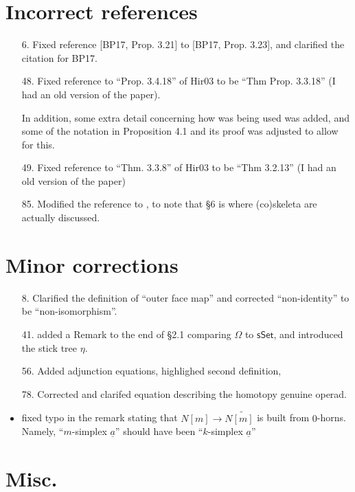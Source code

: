 \documentclass{article}
\begin{document}
\section{Incorrect references}

\begin{itemize}
\item[6.] Fixed reference [BP17, Prop. 3.21] to [BP17, Prop. 3.23], and clarified the citation for BP17.
\item[48.] Fixed reference to ``Prop. 3.4.18'' of Hir03 to be ``Thm Prop. 3.3.18'' (I had an old version of the paper).

In addition, some extra detail concerning how \cite[Prop. 3.3.18]{Hir03} was being used was added, and some of the notation in Proposition 4.1 and its proof was adjusted to allow for this.

\item[49.] Fixed reference to ``Thm. 3.3.8'' of Hir03 to be ``Thm 3.2.13'' (I had an old version of the paper)

\item[85.] Modified the reference \cite[\S 4]{BM11} to \cite[\S 4,\S 6]{BM11}, to note that \S 6 is where (co)skeleta are actually discussed. 
\end{itemize}



\section{Minor corrections}

\begin{itemize}
\item[8.] Clarified the definition of ``outer face map'' and corrected ``non-identity'' to be ``non-isomorphism''.
\item[41.] added a Remark to the end of \S 2.1 comparing $\Omega$ to $\mathsf{sSet}$, and introduced the stick tree $\eta$.
\item[56.] Added adjunction equations, highlighed second definition, 
\item[78.] Corrected and clarifed equation describing the homotopy genuine operad.
\item fixed typo in the remark stating that $N[m] \to N \widetilde{[m]}$ is built from $0$-horns. Namely, ``$m$-simplex $\underline{a}$'' should have been ``$k$-simplex $\underline{a}$''
\end{itemize}

\section{Misc.}
\end{document}
